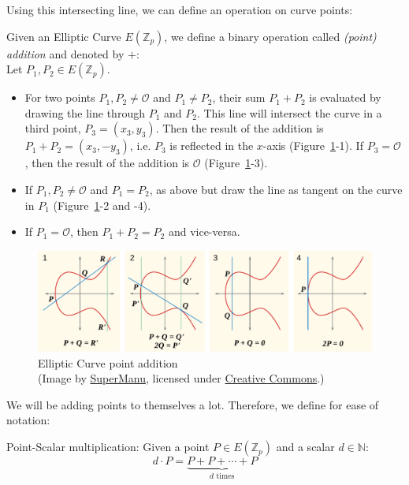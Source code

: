 Using this intersecting line, we can define an operation on curve points:
\begin{definition}
    \label{def:point-add}
    Given an Elliptic Curve $E(\mathbb{Z}_p)$, we define a binary operation called \emph{(point) addition} and denoted by $+$:~\cite{katz_introduction_2015}\\
    Let $P_1, P_2 \in E(\mathbb{Z}_p)$.

    \begin{itemize}
        \item For two points $P_1, P_2 \neq \mathcal{O}$ and $P_1 \neq P_2$, their sum $P_1 + P_2$ is evaluated by drawing the line through $P_1$ and $P_2$. 
            This line will intersect the curve in a third point, $P_3 = (x_3, y_3)$.
            Then the result of the addition is $P_1 + P_2 = (x_3, -y_3)$, i.e. $P_3$ is reflected in the $x$-axis (Figure~\ref{fig:ecc-point-addition}-1).
            If $P_3 = \mathcal{O}$, then the result of the addition is $\mathcal{O}$ (Figure~\ref{fig:ecc-point-addition}-3).
        \item If $P_1, P_2 \neq \mathcal{O}$ and $P_1 = P_2$, as above but draw the line as tangent on the curve in $P_1$ (Figure~\ref{fig:ecc-point-addition}-2 and -4).
        \item If $P_1 = \mathcal{O}$, then $P_1 + P_2 = P_2$ and vice-versa.
    \end{itemize}
\end{definition} 

\begin{figure}
    \includegraphics[width=\textwidth]{figures/ecc_point_addition.pdf}
    \caption[Elliptic Curve point addition]{Elliptic Curve point addition\\(Image by \href{https://commons.wikimedia.org/wiki/File:ECClines-2.svg}{SuperManu}, licensed under \href{https://creativecommons.org/licenses/by-sa/3.0/deed.en}{Creative Commons}.)}
    \label{fig:ecc-point-addition}
\end{figure}

We will be adding points to themselves a lot. Therefore, we define for ease of notation:
\begin{definition}
    Point-Scalar multiplication: Given a point $P \in E(\mathbb{Z}_p)$ and a scalar $d \in \mathbb{N}$: 
    \begin{equation}
        d \cdot P = \underbrace{P + P + \cdots + P}_{d \text{ times}}
    \end{equation}
\end{definition}
 
